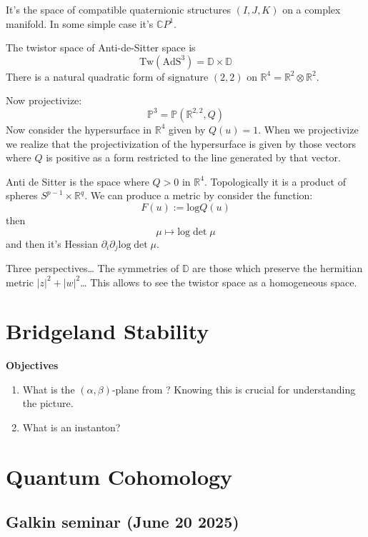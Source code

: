 \begin{definition}
\label{definition-twistor-space}
It's the space of compatible quaternionic structures $(I,J,K)$ on a complex
manifold. In some simple case it's $\mathbb{C}P^{1}$.
\end{definition}

The twistor space of Anti-de-Sitter space is
$$
\text{Tw}(\text{AdS}^3)=\mathbb{D}\times \mathbb{D}
$$
There is a natural quadratic form of signature $(2,2)$ on
$\mathbb{R}^4=\mathbb{R}^2 \otimes \mathbb{R}^2$. 

Now projectivize:
$$
\mathbb{P}^3=\mathbb{P}(\mathbb{R}^{2,2},Q)
$$
Now consider the hypersurface in $\mathbb{R}^4$ given by $Q(u)=1$. When we
projectivize we realize that the projectivization of the hypersurface is given
by those vectors where $Q$ is positive as a form restricted to the line
generated by that vector.

Anti de Sitter is the space where $Q>0$ in $\mathbb{R}^4$. Topologically it is a
product of spheres $S^{p-1}\times \mathbb{R}^q$. We can produce a metric by
consider the function:
$$
F(u):=\text{log}Q(u)
$$
then
$$
\mu \mapsto  \text{log}\det\mu
$$
and then it's Hessian $\partial_i \partial_j \text{log}\det \mu$.

Three perspectives… The symmetries of $\mathbb{D}$ are those which preserve the
 hermitian metric $|z|^2+|w|^2$… This allows to see the twistor space
 as a homogeneous space.

\section{Bridgeland Stability}
\label{section-Bridgeland-stability}

{\bf Objectives}
\begin{enumerate}
\item What is the $(\alpha,\beta)$-plane from \cite{wall-crossing}? Knowing this
is crucial for understanding the picture.
\item What is an instanton?
\end{enumerate}

\section{Quantum Cohomology}
\label{section-quantum-cohomology}

\subsection{Galkin seminar (June 20 2025)}
\label{subsection-Galkin-June-20}

